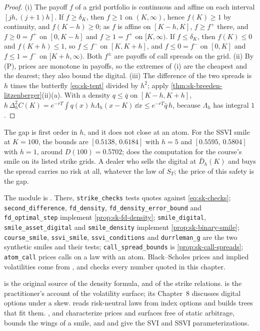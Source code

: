 \begin{proof}
(i) The payoff $f$ of a grid portfolio is continuous and affine on each interval $[jh,(j+1)h]$. If
$f\ge\delta_K$, then $f\ge1$ on $(K,\infty)$, hence $f(K)\ge1$ by continuity, and $f(K-h)\ge0$; as $f$ is
affine on $[K-h,K]$, $f\ge f^+$ there, and $f\ge0=f^+$ on $[0,K-h]$ and $f\ge1=f^+$ on $[K,\infty)$. If
$f\le\delta_K$, then $f(K)\le0$ and $f(K+h)\le1$, so $f\le f^-$ on $[K,K+h]$, and $f\le0=f^-$ on $[0,K]$ and
$f\le1=f^-$ on $[K+h,\infty)$. Both $f^\pm$ are payoffs of call spreads on the grid. (ii) By (P), prices
are monotone in payoffs, so the extremes of (i) are the cheapest and the dearest; they also bound
the digital. (iii) The difference of the two spreads is $h$ times the butterfly \eqref{eq:sk-tent}
divided by $h^2$; apply \cref{thm:sk-breeden-litzenberger}(ii)(a). With a density $q\le\bar q$ on
$[K-h,K+h]$, $h\,\Delta_h^2C(K)=e^{-rT}\int q(x)\,h\Lambda_h(x-K)\,\dd x\le e^{-rT}\bar q\,h$, because
$\Lambda_h$ has integral $1$.
\end{proof}

The gap is first order in $h$, and it does not close at an atom. For the SSVI smile at $K=100$, the
bounds are $[0.5138,\,0.6184]$ with $h=5$ and $[0.5595,\,0.5804]$ with $h=1$, around $D(100)=0.5702$;
 does the computation for the course's smile on its listed strike grids. A
dealer who sells the digital at $\bar D_h(K)$ and buys the spread carries no risk at all, whatever the
law of $S_T$; the price of this safety is the gap.

\begin{incode}
The module is . There, \texttt{strike\_checks} tests quotes against \eqref{eq:sk-checks};
\texttt{second\_difference}, \texttt{fd\_density}, \texttt{fd\_density\_error\_bound} and \texttt{fd\_optimal\_step}
implement \cref{prop:sk-fd-density}; \texttt{smile\_digital}, \texttt{smile\_asset\_digital} and
\texttt{smile\_density} implement \cref{prop:sk-binary-smile}; \texttt{course\_smile}, \texttt{ssvi\_smile},
\texttt{ssvi\_conditions} and \texttt{durrleman\_g} are the two synthetic smiles and their tests;
\texttt{call\_spread\_bounds} is \cref{prop:sk-call-spreads}; \texttt{atom\_call} prices calls on a law with an
atom. Black--Scholes prices and implied volatilities come from , and
 checks every number quoted in this chapter.
\end{incode}

\furtherreading
\textcite{breeden-litzenberger} is the original source of the density formula, and
\textcite{merton1973} of the strike relations. \textcite{gatheral-volatility-surface} is the
practitioner's account of the volatility surface; its Chapter~8 discusses digital options under a skew.
\textcite{rubinstein-1994} reads risk-neutral laws from index options and builds trees that fit them.
\textcite{davis-hobson}, \textcite{carr-madan-2005} and \textcite{roper-arbitrage-free} characterize prices and
surfaces free of static arbitrage, \textcite{lee-moment-formula} bounds the wings of a smile, and
\textcite{gatheral-svi-2004} and \textcite{gatheral-jacquier-2014} give the SVI and SSVI parameterizations.
